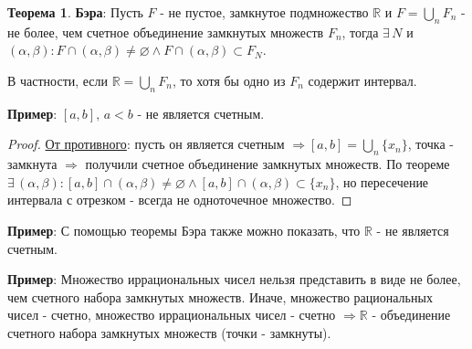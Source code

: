 \documentclass[12pt]{article}
\theoremstyle{definition}
\newtheorem{theorem}{Теорема}
\begin{document}
	
\begin{theorem}\textbf{Бэра}:
	Пусть $F$ - не пустое, замкнутое подмножество $\mathbb{R}$ и $F = \bigcup\limits_{n} F_n$ - не более, чем счетное объединение замкнутых множеств $F_n$, тогда $\exists \, N$ и $(\alpha, \beta) \colon F \cap (\alpha,\beta) \neq \varnothing \wedge F \cap (\alpha,\beta) \subset F_N$. 
	
	В частности, если $\mathbb{R} = \bigcup\limits_n F_n$, то хотя бы одно из $F_n$ содержит интервал.
\end{theorem}

\textbf{Пример}: $[a,b], \, a < b$ - не является счетным. 
\begin{proof}
	\uline{От противного}: пусть он является счетным $\Rightarrow [a,b] =  \bigcup\limits_n \{x_n\}$, точка - замкнута $\Rightarrow$ получили счетное объединение замкнутых множеств. По теореме $\exists \, (\alpha, \beta) \colon [a,b] \cap (\alpha,\beta) \neq \varnothing \wedge [a,b] \cap (\alpha, \beta) \subset \{x_n\}$, но пересечение интервала с отрезком - всегда не одноточечное множество.
\end{proof}

\textbf{Пример}: С помощью теоремы Бэра также можно показать, что $\mathbb{R}$ - не является счетным.

\textbf{Пример}: Множество иррациональных чисел нельзя представить в виде не более, чем счетного набора замкнутых множеств. Иначе, множество рациональных чисел - счетно, множество иррациональных чисел - счетно $\Rightarrow \mathbb{R}$ - объединение счетного набора замкнутых множеств (точки - замкнуты).
\end{document}
